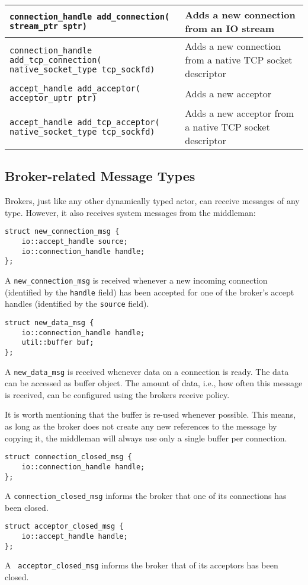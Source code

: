 {\begin{tabular*}{\textwidth}{m{}m{}}
  \hline
  \lstinline^connection_handle add_connection(^ \lstinline^stream_ptr sptr)^ & Adds a new connection from an IO stream \\
  \hline
  \lstinline^connection_handle add_tcp_connection(^ \lstinline^native_socket_type tcp_sockfd)^ & Adds a new connection from a native TCP socket descriptor \\
  \hline
  \lstinline^accept_handle add_acceptor(^ \lstinline^acceptor_uptr ptr)^ & Adds a new acceptor \\
  \hline
  \lstinline^accept_handle add_tcp_acceptor(^ \lstinline^native_socket_type tcp_sockfd)^ & Adds a new acceptor from a native TCP socket descriptor \\
  \hline
\end{tabular*}
}

\clearpage
\subsection{Broker-related Message Types}

Brokers, just like any other dynamically typed actor, can receive messages of any type.
However, it also receives system messages from the middleman:

\begin{lstlisting}
struct new_connection_msg {
    io::accept_handle source;
    io::connection_handle handle;
};
\end{lstlisting}

A \lstinline^new_connection_msg^ is received whenever a new incoming connection (identified by the \lstinline^handle^ field) has been accepted for one of the broker's accept handles (identified by the \lstinline^source^ field).

\begin{lstlisting}
struct new_data_msg {
    io::connection_handle handle;
    util::buffer buf;
};
\end{lstlisting}

A \lstinline^new_data_msg^ is received whenever data on a connection is ready.
The data can be accessed as buffer object.
The amount of data, i.e., how often this message is received, can be configured using the brokers receive policy.

It is worth mentioning that the buffer is re-used whenever possible.
This means, as long as the broker does not create any new references to the message by copying it, the middleman will always use only a single buffer per connection.

\begin{lstlisting}
struct connection_closed_msg {
    io::connection_handle handle;
};
\end{lstlisting}

A \lstinline^connection_closed_msg^ informs the broker that one of its connections has been closed.

\begin{lstlisting}
struct acceptor_closed_msg {
    io::accept_handle handle;
};
\end{lstlisting}

A \lstinline^ acceptor_closed_msg^ informs the broker that of its acceptors has been closed.
